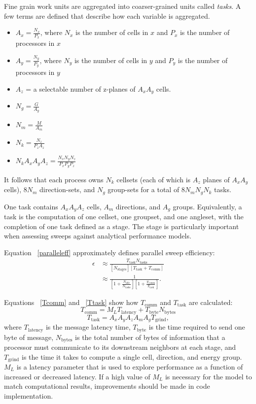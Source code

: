 \documentclass[11pt, letterpaper,titlepage,oneside]{article}
\begin{document}
Fine grain work units are aggregated into coarser-grained units called \textit{tasks}. A few terms are defined that describe how each variable is aggregated.
\begin{itemize}
\item $A_x = \frac{N_x}{P_x}$, where $N_x$ is the number of cells in $x$ and $P_x$ is the number of processors in $x$
\item $A_y = \frac{N_y}{P_y}$, where $N_y$ is the number of cells in $y$ and $P_y$ is the number of processors in $y$
\item $A_z$ = a selectable number of z-planes of $A_x A_y$ cells.
\item $N_g = \frac{G}{A_g}$
\item $N_m = \frac{M}{A_m}$
\item $N_k = \frac{N_z}{P_z A_z}$
\item $N_k A_x A_y A_z = \frac{N_x N_y N_z}{P_x P_y P_z}$
\end{itemize}

It follows that each process owns $N_k$ cellsets (each of which is $A_z$ planes of $A_x A_y$ cells), $8N_m$ direction-sets, and $N_g$ group-sets for a total of $8N_m N_g N_k$ tasks.

One task contains $A_x A_y A_z$ cells, $A_m$ directions, and $A_g$ groups. Equivalently, a task is the computation of one cellset, one groupset, and one angleset, with the completion of one task defined as a stage.  The stage is particularly important when assessing sweeps against analytical performance models. 

Equation ~\eqref{paralleleff} approximately defines parallel sweep efficiency:
\begin{equation}\label{paralleleff}
\begin{split}
\epsilon &\approx \frac{T_{\text{task}} N_{\text{tasks}}}{[N_{\text{stages}}] [T_{\text{task}} + T_{\text{comm}}]} \\
            &\approx\frac{1}{[1+\frac{N_{\text{idle}}}{N_{\text{tasks}}}][1 + \frac{T_{\text{comm}}}{T_{\text{task}}}]}.
\end{split}
\end{equation}

Equations ~\eqref{Tcomm} and ~\eqref{Ttask} show how $T_{\text{comm}}$ and $T_{\text{task}}$ are calculated:
\begin{equation}
T_{\text{comm}} = M_L T_{\text{latency}} + T_{\text{byte}} N_{\text{bytes}}
\label{Tcomm}
\end{equation}
\begin{equation}
T_{\text{task}} = A_x A_y A_z A_m A_g T_{\text{grind}},
\label{Ttask}
\end{equation}
where $T_{\text{latency}}$ is the message latency time, $T_{\text{byte}}$ is the time required to send one byte of message, $N_{\text{bytes}}$ is the total number of bytes of information that a processor must communicate to its downstream neighbors at each stage, and $T_{\text{grind}}$ is the time it takes to compute a single cell, direction, and energy group. $M_L$ is a latency parameter that is used to explore performance as a function of increased or decreased latency. If a high value of $M_L$ is necessary for the model to match computational results, improvements should be made in code implementation.
\end{document}
